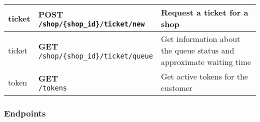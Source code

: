 \begin{tabularx}{\textwidth}{|p{}|l|X|}
ticket & \makecell{\textbf{POST} \\ \texttt{/shop/\{shop\_id\}/ticket/new}}  & Request a ticket for a shop \\\hline
ticket & \makecell{\textbf{GET} \\ \texttt{/shop/\{shop\_id\}/ticket/queue}}  & Get information about the queue status and approximate waiting time \\\hline
token & \makecell{\textbf{GET} \\ \texttt{/tokens}}  & Get active tokens for the customer \\\hline
\end{tabularx}

\subsubsection{Endpoints}

